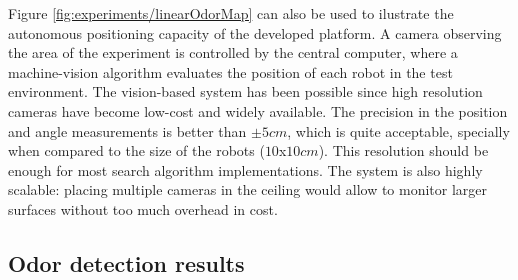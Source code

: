 \vspace{-0.3cm}

Figure \ref{fig:experiments/linearOdorMap} can also be used to ilustrate the autonomous positioning capacity of the developed platform. A camera observing the area of the experiment is controlled by the central computer, where a machine-vision algorithm evaluates the position of each robot in the test environment.
The vision-based system has been possible since high resolution cameras have become low-cost and widely available. The precision in the position and angle measurements is better than $\pm 5cm$, which is quite acceptable, specially when compared to the size of the robots ($10$x$10cm$).
This resolution should be enough for most search algorithm implementations. The system is also highly scalable: placing multiple cameras in the ceiling would allow to monitor larger surfaces without too much overhead in cost.



\vspace{-0.3cm}

\subsection{Odor detection results}

\vspace{-0.3cm}

